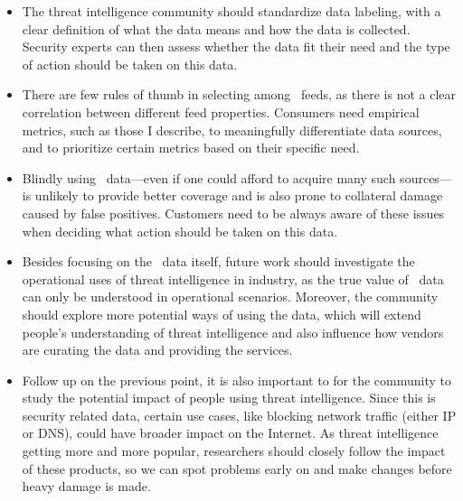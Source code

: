 \begin{itemize}
    \item The threat intelligence community should standardize data labeling,
    with a clear definition of what the data means and how the data is 
    collected. Security experts can then assess whether the data fit their 
    need and the type of action should be taken on this data.

    \item There are few rules of thumb in selecting among \ti\ feeds,
    as there is not a clear correlation between different feed properties.
    Consumers need empirical metrics, such as those I describe, to
    meaningfully differentiate data sources, and to prioritize certain 
    metrics based on their specific need.

    \item Blindly using \ti\ data---even if one could afford to acquire
    many such sources---is unlikely to provide better coverage and is
    also prone to collateral damage caused by false positives. Customers
    need to be always aware of these issues when deciding what action
    should be taken on this data.

    \item Besides focusing on the \ti\ data itself, future work should 
    investigate the operational uses of threat intelligence in industry, 
    as the true value of \ti\ data can only be understood in operational
    scenarios. Moreover, the community should explore more potential ways 
    of using the data, which will extend people's understanding of threat 
    intelligence and also influence how vendors are curating the data and
    providing the services.

    \item Follow up on the previous point, it is also important to for the
    community to study the potential impact of people using threat 
    intelligence. Since this is security related data, certain use cases,
    like blocking network traffic (either IP or DNS), could have broader
    impact on the Internet. As threat intelligence getting more and more
    popular, researchers should closely follow the impact of these products,
    so we can spot problems early on and make changes before heavy damage
    is made.

\end{itemize}
